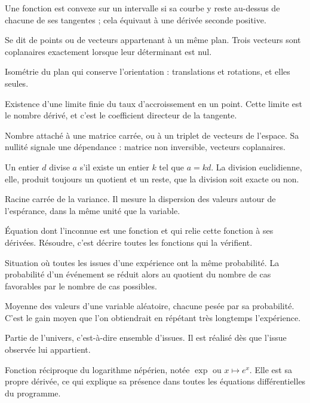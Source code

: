 Une fonction est convexe sur un intervalle si sa courbe y reste au-dessus de
chacune de ses tangentes ; cela équivaut à une dérivée seconde positive.

Se dit de points ou de vecteurs appartenant à un même plan. Trois vecteurs
sont coplanaires exactement lorsque leur déterminant est nul.


Isométrie du plan qui conserve l'orientation : translations et rotations, et
elles seules.

Existence d'une limite finie du taux d'accroissement en un point. Cette limite
est le nombre dérivé, et c'est le coefficient directeur de la tangente.

Nombre attaché à une matrice carrée, ou à un triplet de vecteurs de l'espace.
Sa nullité signale une dépendance : matrice non inversible, vecteurs
coplanaires.

Un entier $d$ divise $a$ s'il existe un entier $k$ tel que $a = kd$. La
division euclidienne, elle, produit toujours un quotient et un reste, que la
division soit exacte ou non.


Racine carrée de la variance. Il mesure la dispersion des valeurs autour de
l'espérance, dans la même unité que la variable.

Équation dont l'inconnue est une fonction et qui relie cette fonction à ses
dérivées. Résoudre, c'est décrire toutes les fonctions qui la vérifient.

Situation où toutes les issues d'une expérience ont la même probabilité. La
probabilité d'un événement se réduit alors au quotient du nombre de cas
favorables par le nombre de cas possibles.

Moyenne des valeurs d'une variable aléatoire, chacune pesée par sa
probabilité. C'est le gain moyen que l'on obtiendrait en répétant très
longtemps l'expérience.

Partie de l'univers, c'est-à-dire ensemble d'issues. Il est réalisé dès que
l'issue observée lui appartient.

Fonction réciproque du logarithme népérien, notée $\exp$ ou $x \mapsto e^{x}$.
Elle est sa propre dérivée, ce qui explique sa présence dans toutes les
équations différentielles du programme.

